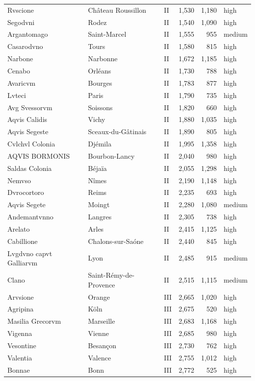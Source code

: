 \documentclass[11pt,a4paper]{article}
\begin{document}
{\begin{longtable}{p{4.6cm}p{5.2cm}lrrl}
Rvscione & Château Roussillon & II & 1,530 & 1,180 & high\\
Segodvni & Rodez & II & 1,540 & 1,090 & high\\
Argantomago & Saint-Marcel & II & 1,555 & 955 & medium\\
Casarodvno & Tours & II & 1,580 & 815 & high\\
Narbone & Narbonne & II & 1,672 & 1,185 & high\\
Cenabo & Orléans & II & 1,730 & 788 & high\\
Avaricvm & Bourges & II & 1,783 & 877 & high\\
Lvteci & Paris & II & 1,790 & 735 & high\\
Avg Svessorvm & Soissons & II & 1,820 & 660 & high\\
Aqvis Calidis & Vichy & II & 1,880 & 1,035 & high\\
Aqvis Segeste & Sceaux-du-Gâtinais & II & 1,890 & 805 & high\\
Cvlchvl Colonia & Djémila & II & 1,995 & 1,358 & high\\
AQVIS BORMONIS & Bourbon-Lancy & II & 2,040 & 980 & high\\
Saldas Colonia & Béjaïa & II & 2,055 & 1,298 & high\\
Nemvso & Nîmes & II & 2,190 & 1,148 & high\\
Dvrocortoro & Reims & II & 2,235 & 693 & high\\
Aqvis Segete & Moingt & II & 2,280 & 1,080 & medium\\
Andemantvnno & Langres & II & 2,305 & 738 & high\\
Arelato & Arles & II & 2,415 & 1,125 & high\\
Cabillione & Chalons-sur-Saóne & II & 2,440 & 845 & high\\
Lvgdvno capvt Galliarvm & Lyon & II & 2,485 & 915 & medium\\
Clano & Saint-Rémy-de-Provence & II & 2,515 & 1,115 & medium\\
Arvsione & Orange & III & 2,665 & 1,020 & high\\
Agripina & Köln & III & 2,675 & 520 & high\\
Masilia Grecorvm & Marseille & III & 2,683 & 1,168 & high\\
Vigenna & Vienne & III & 2,685 & 980 & high\\
Vesontine & Besançon & III & 2,730 & 762 & high\\
Valentia & Valence & III & 2,755 & 1,012 & high\\
Bonnae & Bonn & III & 2,772 & 525 & high\\

\end{longtable}}
\end{document}
